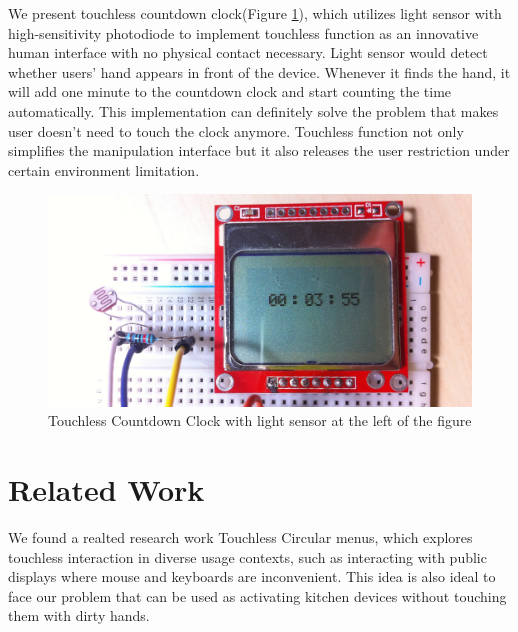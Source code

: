 \documentclass{sig-alternate-ipsn13}
\begin{document}
We present touchless countdown clock(Figure \ref{fig:demo1}), which utilizes light sensor with high-sensitivity photodiode to implement touchless function as an innovative human interface with no physical contact necessary.
Light sensor would detect whether users' hand appears in front of the device. Whenever it finds the hand, it will add one minute to the countdown clock and start counting the time automatically. This implementation can definitely solve the problem that makes user doesn't need to touch the clock anymore. Touchless function not only simplifies the manipulation interface but it also releases the user restriction under certain environment limitation.
 




\begin{figure}
  \centering
  \includegraphics[width=0.8\linewidth]{Figures/demo1.jpg}
  \caption{Touchless Countdown Clock with light sensor at the left of the figure}
  \label{fig:demo1}
\end{figure}

\section{Related Work}
We found a realted research work Touchless Circular menus\cite{cite1}, which explores touchless interaction in diverse usage contexts, such as interacting with public displays where mouse and keyboards are inconvenient. This idea is also ideal to face our problem that can be used as activating kitchen devices without touching them with dirty hands.
\end{document}
